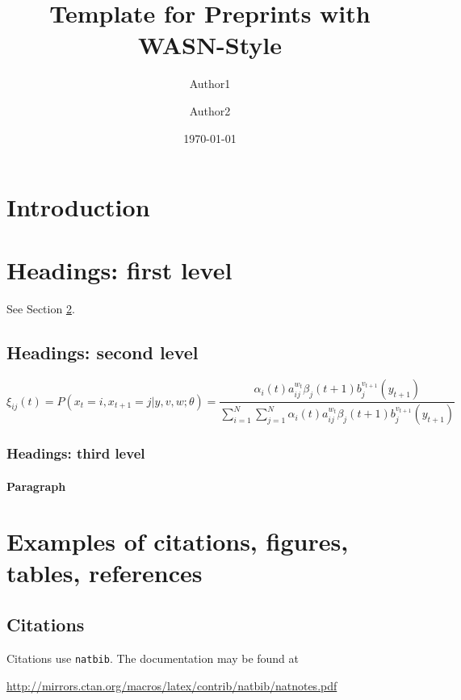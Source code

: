 \documentclass[]{wasn}
\title{Template for Preprints with WASN-Style}
\author[1]{Author1}
\author[2]{Author2}
\affiliation[1]{Affiliation}
\affiliation[2]{Affiliation}
\date{\today}
\theoremstyle{plain}
\theoremstyle{definition}
\theoremstyle{remark}
\begin{document}
\maketitle

\section{Introduction}
\lipsum[2]
\lipsum[3]

\section{Headings: first level}
\label{sec:headings}

\lipsum[4] See Section \ref{sec:headings}.

\subsection{Headings: second level}
\lipsum[5]
\begin{equation}
	\xi _{ij}(t)=P(x_{t}=i,x_{t+1}=j|y,v,w;\theta)= {\frac {\alpha _{i}(t)a^{w_t}_{ij}\beta _{j}(t+1)b^{v_{t+1}}_{j}(y_{t+1})}{\sum _{i=1}^{N} \sum _{j=1}^{N} \alpha _{i}(t)a^{w_t}_{ij}\beta _{j}(t+1)b^{v_{t+1}}_{j}(y_{t+1})}}
\end{equation}

\subsubsection{Headings: third level}
\lipsum[6]

\paragraph{Paragraph}
\lipsum[7]

\section{Examples of citations, figures, tables, references}
\label{sec:others}

\subsection{Citations}
Citations use \verb+natbib+. The documentation may be found at
\begin{center}
    \url{http://mirrors.ctan.org/macros/latex/contrib/natbib/natnotes.pdf}
\end{center}
\end{document}

